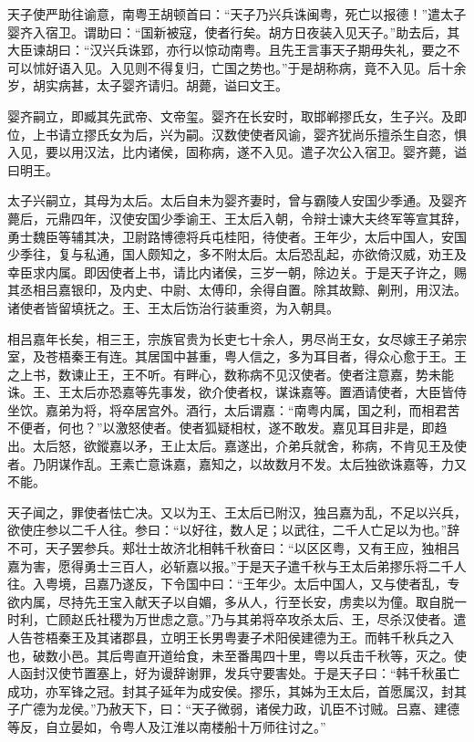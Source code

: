 \documentclass[]{article}
\begin{document}
天子使严助往谕意，南粤王胡顿首曰：``天子乃兴兵诛闽粤，死亡以报德！''遣太子婴齐入宿卫。谓助曰：``国新被寇，使者行矣。胡方日夜装入见天子。''助去后，其大臣谏胡曰：``汉兴兵诛郢，亦行以惊动南粤。且先王言事天子期毋失礼，要之不可以怵好语入见。入见则不得复归，亡国之势也。''于是胡称病，竟不入见。后十余岁，胡实病甚，太子婴齐请归。胡薨，谥曰文王。

婴齐嗣立，即臧其先武帝、文帝玺。婴齐在长安时，取邯郸摎氏女，生子兴。及即位，上书请立摎氏女为后，兴为嗣。汉数使使者风谕，婴齐犹尚乐擅杀生自恣，惧入见，要以用汉法，比内诸侯，固称病，遂不入见。遣子次公入宿卫。婴齐薨，谥曰明王。

太子兴嗣立，其母为太后。太后自未为婴齐妻时，曾与霸陵人安国少季通。及婴齐薨后，元鼎四年，汉使安国少季谕王、王太后入朝，令辩士谏大夫终军等宣其辞，勇士魏臣等辅其决，卫尉路博德将兵屯桂阳，待使者。王年少，太后中国人，安国少季往，复与私通，国人颇知之，多不附太后。太后恐乱起，亦欲倚汉威，劝王及幸臣求内属。即因使者上书，请比内诸侯，三岁一朝，除边关。于是天子许之，赐其丞相吕嘉银印，及内史、中尉、太傅印，余得自置。除其故黥、劓刑，用汉法。诸使者皆留填抚之。王、王太后饬治行装重资，为入朝具。

相吕嘉年长矣，相三王，宗族官贵为长吏七十余人，男尽尚王女，女尽嫁王子弟宗室，及苍梧秦王有连。其居国中甚重，粤人信之，多为耳目者，得众心愈于王。王之上书，数谏止王，王不听。有畔心，数称病不见汉使者。使者注意嘉，势未能诛。王、王太后亦恐嘉等先事发，欲介使者权，谋诛嘉等。置酒请使者，大臣皆侍坐饮。嘉弟为将，将卒居宫外。酒行，太后谓嘉：``南粤内属，国之利，而相君苦不便者，何也？''以激怒使者。使者狐疑相杖，遂不敢发。嘉见耳目非是，即趋出。太后怒，欲鏦嘉以矛，王止太后。嘉遂出，介弟兵就舍，称病，不肯见王及使者。乃阴谋作乱。王素亡意诛嘉，嘉知之，以故数月不发。太后独欲诛嘉等，力又不能。

天子闻之，罪使者怯亡决。又以为王、王太后已附汉，独吕嘉为乱，不足以兴兵，欲使庄参以二千人往。参曰：``以好往，数人足；以武往，二千人亡足以为也。''辞不可，天子罢参兵。郏壮士故济北相韩千秋奋曰：``以区区粤，又有王应，独相吕嘉为害，愿得勇士三百人，必斩嘉以报。''于是天子遣千秋与王太后弟摎乐将二千人往。入粤境，吕嘉乃遂反，下令国中曰：``王年少。太后中国人，又与使者乱，专欲内属，尽持先王宝入献天子以自媚，多从人，行至长安，虏卖以为僮。取自脱一时利，亡顾赵氏社稷为万世虑之意。''乃与其弟将卒攻杀太后、王，尽杀汉使者。遣人告苍梧秦王及其诸郡县，立明王长男粤妻子术阳侯建德为王。而韩千秋兵之入也，破数小邑。其后粤直开道给食，未至番禺四十里，粤以兵击千秋等，灭之。使人函封汉使节置塞上，好为谩辞谢罪，发兵守要害处。于是天子曰：``韩千秋虽亡成功，亦军锋之冠。封其子延年为成安侯。摎乐，其姊为王太后，首愿属汉，封其子广德为龙侯。''乃赦天下，曰：``天子微弱，诸侯力政，讥臣不讨贼。吕嘉、建德等反，自立晏如，令粤人及江淮以南楼船十万师往讨之。''
\end{document}
